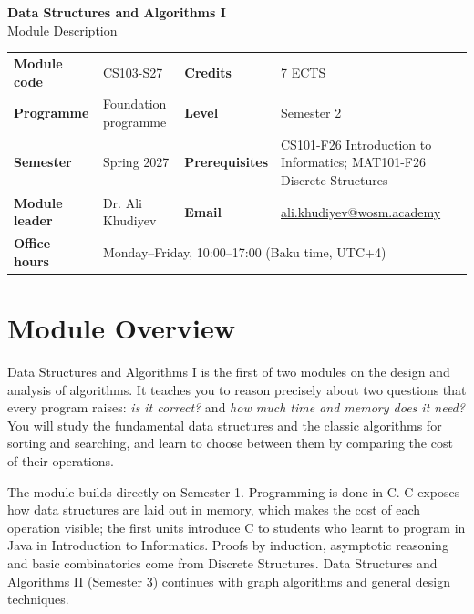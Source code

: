 \documentclass[11pt,a4paper]{article}
\makeatletter
\newcommand{\ModuleTitle}{Data Structures and Algorithms I}
\newcommand{\ModuleCode}{CS103-S27}
\newcommand{\Programme}{Foundation programme}
\newcommand{\Level}{Semester 2}
\newcommand{\Semester}{Spring 2027}
\newcommand{\Credits}{7 ECTS}
\newcommand{\ModuleLeader}{Dr. Ali Khudiyev}
\newcommand{\Email}{ali.khudiyev@wosm.academy}
\newcommand{\OfficeHours}{Monday--Friday, 10:00--17:00 (Baku time, UTC+4)}
\newcommand{\Prerequisites}{CS101-F26 Introduction to Informatics; MAT101-F26 Discrete Structures}
\makeatother
\begin{document}
\begin{center}
  {\LARGE\bfseries\color{accent} \ModuleTitle}\\[4pt]
  {\large Module Description}
\end{center}
\vspace{6pt}

\begin{tabularx}{\textwidth}{>{\bfseries}l X >{\bfseries}l X}
\toprule
Module code   & \ModuleCode    & Credits      & \Credits \\
Programme     & \Programme     & Level        & \Level \\
Semester      & \Semester      & Prerequisites & \Prerequisites \\
Module leader & \ModuleLeader  & Email        & \href{mailto:\Email}{\Email} \\
Office hours  & \multicolumn{3}{l}{\OfficeHours} \\
\bottomrule
\end{tabularx}

\section{Module Overview}
Data Structures and Algorithms I is the first of two modules on the design and
analysis of algorithms. It teaches you to reason precisely about two questions that
every program raises: \emph{is it correct?} and \emph{how much time and memory does
it need?} You will study the fundamental data structures and the classic algorithms
for sorting and searching, and learn to choose between them by comparing the cost of
their operations.

The module builds directly on Semester 1. Programming is done in C. C exposes how
data structures are laid out in memory, which makes the cost of each operation
visible; the first units introduce C to students who learnt to program in Java in
Introduction to Informatics. Proofs by induction, asymptotic reasoning and basic
combinatorics come from Discrete Structures. Data Structures and Algorithms II
(Semester 3) continues with graph algorithms and general design techniques.
\end{document}
